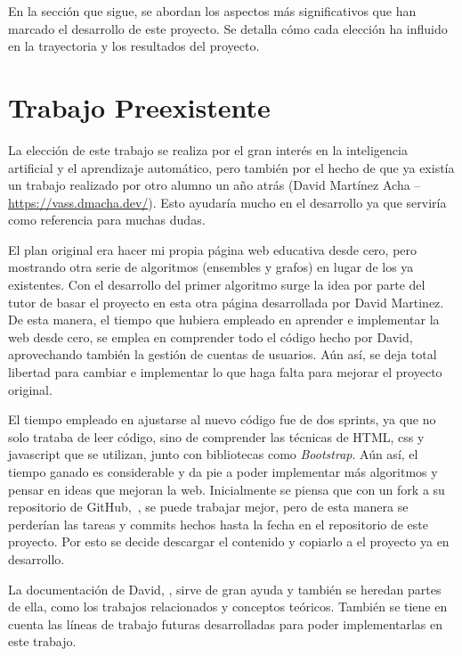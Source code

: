 En la sección que sigue, se abordan los aspectos más significativos que han marcado el desarrollo de este proyecto. Se detalla cómo cada elección ha influido en la trayectoria y los resultados del proyecto.

\section{Trabajo Preexistente}
La elección de este trabajo se realiza por el gran interés en la inteligencia artificial y el aprendizaje automático, pero también por el hecho de que ya existía un trabajo realizado por otro alumno un año atrás (David Martínez Acha -- \url{https://vass.dmacha.dev/}). Esto ayudaría mucho en el desarrollo ya que serviría como referencia para muchas dudas.

El plan original era hacer mi propia página web educativa desde cero, pero mostrando otra serie de algoritmos (ensembles y grafos) en lugar de los ya existentes. Con el desarrollo del primer algoritmo surge la idea por parte del tutor de basar el proyecto en esta otra página desarrollada por David Martinez. De esta manera, el tiempo que hubiera empleado en aprender e implementar la web desde cero, se emplea en comprender todo el código hecho por David, aprovechando también la gestión de cuentas de usuarios. Aún así, se deja total libertad para cambiar e implementar lo que haga falta para mejorar el proyecto original.

El tiempo empleado en ajustarse al nuevo código fue de dos sprints, ya que no solo trataba de leer código, sino de comprender las técnicas de HTML, css y javascript que se utilizan, junto con bibliotecas como \textit{Bootstrap}.
Aún así, el tiempo ganado es considerable y da pie a poder implementar más algoritmos y pensar en ideas que mejoran la web.
Inicialmente se piensa que con un fork a su repositorio de GitHub,~\cite{GH:VASS}, se puede trabajar mejor, pero de esta manera se perderían las tareas y commits hechos hasta la fecha en el repositorio de este proyecto. Por esto se decide descargar el contenido y copiarlo a el proyecto ya en desarrollo.

La documentación de David, \cite{TFG:David}, sirve de gran ayuda y también se heredan partes de ella, como los trabajos relacionados y conceptos teóricos. También se tiene en cuenta las líneas de trabajo futuras desarrolladas para poder implementarlas en este trabajo.
